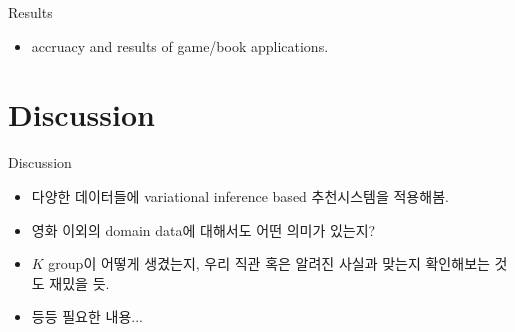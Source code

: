 \documentclass{beamer}
\begin{document}
\begin{frame}{Results}
	\begin{itemize}
		\item accruacy and results of game/book applications.
	\end{itemize}
\end{frame}

\section{Discussion}
\begin{frame}{Discussion}
    \begin{itemize}
        \item 다양한 데이터들에 variational inference based 추천시스템을 적용해봄.
        \item 영화 이외의 domain data에 대해서도 어떤 의미가 있는지?
        \item $K$ group이 어떻게 생겼는지, 우리 직관 혹은 알려진 사실과 맞는지 확인해보는 것도 재밌을 듯.
        \item 등등 필요한 내용...
    \end{itemize}
\end{frame}
\end{document}
